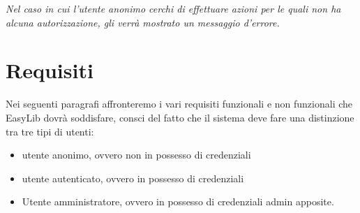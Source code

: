 \documentclass{article}
\begin{document}
\textit{Nel caso in cui l’utente anonimo cerchi di effettuare azioni per le quali non ha alcuna autorizzazione, gli verrà mostrato un messaggio d’errore.} \\

\section{Requisiti} Nei seguenti paragrafi affronteremo i vari requisiti funzionali e non funzionali che EasyLib dovrà soddisfare, consci del fatto che il sistema deve fare una distinzione tra tre tipi di utenti: 
    \begin{itemize}
        \item utente anonimo, ovvero non in possesso di credenziali
        \item utente autenticato, ovvero in possesso di credenziali 
        \item Utente amministratore, ovvero in possesso di credenziali admin apposite.
    \end{itemize}
\end{document}
